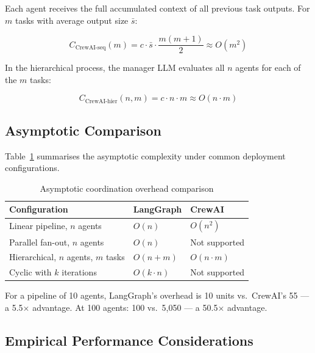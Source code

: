\documentclass[12pt,a4paper]{article}
\begin{document}
Each agent receives the full accumulated context of all previous task outputs.
For $m$ tasks with average output size $\bar{s}$:

\begin{equation}
    \label{eq:crew_seq}
    C_{\text{CrewAI-seq}}(m) = c \cdot \bar{s} \cdot \frac{m(m+1)}{2}
    \approx O(m^2)
\end{equation}

In the hierarchical process, the manager LLM evaluates all $n$ agents for each
of the $m$ tasks:

\begin{equation}
    \label{eq:crew_hier}
    C_{\text{CrewAI-hier}}(n, m) = c \cdot n \cdot m \approx O(n \cdot m)
\end{equation}

\subsection{Asymptotic Comparison}

Table~\ref{tab:complexity} summarises the asymptotic complexity under common
deployment configurations.

\begin{table}[H]
    \centering
    \caption{Asymptotic coordination overhead comparison}
    \label{tab:complexity}
    \renewcommand{\arraystretch}{1.4}
    \begin{tabular}{lll}
        \toprule
        \textbf{Configuration} & \textbf{LangGraph} & \textbf{CrewAI} \\
        \midrule
        Linear pipeline, $n$ agents       & $O(n)$         & $O(n^2)$       \\
        Parallel fan-out, $n$ agents       & $O(n)$         & Not supported  \\
        Hierarchical, $n$ agents, $m$ tasks & $O(n + m)$   & $O(n \cdot m)$ \\
        Cyclic with $k$ iterations         & $O(k \cdot n)$ & Not supported  \\
        \bottomrule
    \end{tabular}
\end{table}

For a pipeline of 10 agents, LangGraph's overhead is 10 units vs.\ CrewAI's
55 --- a 5.5$\times$ advantage. At 100 agents: 100 vs.\ 5{,}050 ---
a 50.5$\times$ advantage.

\subsection{Empirical Performance Considerations}
\end{document}
